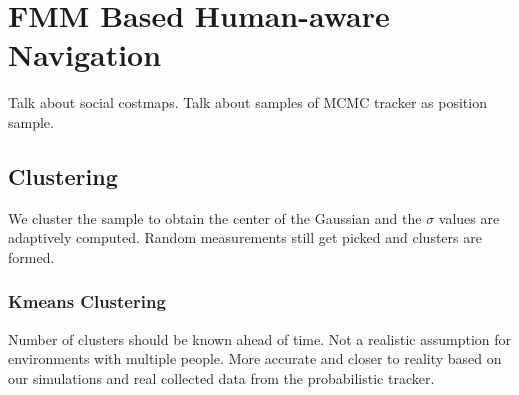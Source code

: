 

\section{FMM Based Human-aware Navigation}

Talk about social costmaps.
Talk about samples of MCMC tracker as position sample.
\subsection{Clustering}
We cluster the sample to obtain the center of the Gaussian and the $\sigma$ values are adaptively computed.
Random measurements still get picked and clusters are formed.

\subsubsection{Kmeans Clustering}
Number of clusters should be known ahead of time. Not a realistic assumption for environments with multiple people. More accurate and closer to reality based on our simulations and real collected data from the probabilistic tracker.


